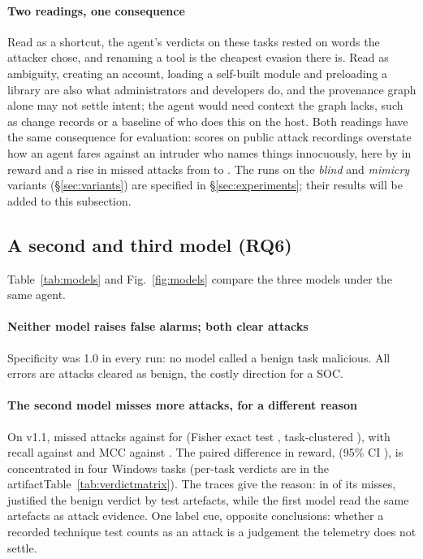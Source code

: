 \paragraph{Two readings, one consequence} Read as a shortcut, the agent's verdicts on these tasks rested on
words the attacker chose, and renaming a tool is the cheapest evasion there is. Read as ambiguity, creating an
account, loading a self-built module and preloading a library are also what administrators and developers do,
and the provenance graph alone may not settle intent; the agent would need context the graph lacks, such as
change records or a baseline of who does this on the host. Both readings have the same consequence for
evaluation: scores on public attack recordings overstate how an agent fares against an intruder who names
things innocuously, here by \ResMimicryPairedReward{} in reward and a rise in missed attacks from
\ResCueBaseMissed{} to \ResMimicryMissed{}.
\else
The runs on the \emph{blind} and \emph{mimicry} variants (\S\ref{sec:variants}) are specified in
\S\ref{sec:experiments}; their results will be added to this subsection.
\fi

\subsection{A second and third model (RQ6)}
\label{sec:models}

Table~\ref{tab:models} and Fig.~\ref{fig:models} compare the three models under the same agent.

\paragraph{Neither model raises false alarms; both clear attacks} Specificity was 1.0 in every run: no model
called a benign task malicious. All errors are attacks cleared as benign, the costly direction for a SOC.

\paragraph{The second model misses more attacks, for a different reason} On \bench v1.1, \McModelB{} missed
\McGptBaseMissed{} attacks against \McClaudeBaseMissed{} for \McModelA{} (Fisher exact test \McMissP{},
task-clustered \McMissClusterP{}),
with recall \McGptBaseRecall{} against \McClaudeBaseRecall{} and MCC \McGptBaseMcc{} against
\McClaudeBaseMcc{}. The paired difference in reward, \McDiffRewardBase{} (95\% CI \McDiffRewardBaseCI{}),
is concentrated in four Windows tasks (\ifconf per-task verdicts are in the artifact\else Table~\ref{tab:verdictmatrix}\fi). The traces give the reason: in
\McGptBaseCueMisses{} of its misses, \McModelB{} justified the benign verdict by test artefacts, while the first
model read the same artefacts as attack evidence. One label cue, opposite conclusions: whether a recorded
technique test counts as an attack is a judgement the telemetry does not settle.

